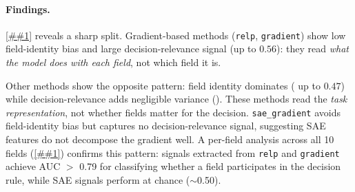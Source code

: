 \documentclass{article} %
\newcommand{\Cref}[1]{\ref{##1}}
\begin{document}





\vspace{-0.15in}
\paragraph{Findings.}
\Cref{tab:mechanistic} reveals a sharp split.
Gradient-based methods (\texttt{relp}, \texttt{gradient}) show low field-identity bias and large decision-relevance signal (up to $0.56$): they read \emph{what the model does with each field}, not which field it is.

Other methods show the opposite pattern: field identity dominates ( up to $0.47$) while decision-relevance adds negligible variance (). These methods read the \emph{task representation}, not whether fields matter for the decision.
\texttt{sae\_gradient} avoids field-identity bias but captures no decision-relevance signal, suggesting SAE features do not decompose the gradient well.
A per-field analysis across all 10 fields (\Cref{app:mechanistic}) confirms this pattern: signals extracted from \texttt{relp} and \texttt{gradient} achieve AUC $>$ 0.79 for classifying whether a field participates in the decision rule, while SAE signals perform at chance (${\sim}$0.50).
\end{document}
